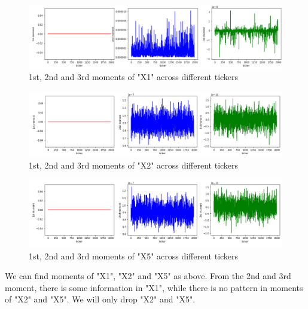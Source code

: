 \documentclass[onecolumn]{article}
\begin{document}
\begin{figure}[H]
\centering
\includegraphics[scale=0.52]{moments_x1.PNG}
\caption{1st, 2nd and 3rd moments of "X1" across different tickers}
\label{fig:label}
\end{figure}

\begin{figure}[H]
\centering
\includegraphics[scale=0.7]{moments_x2.PNG}
\caption{1st, 2nd and 3rd moments of "X2" across different tickers}
\label{fig:label}
\end{figure}

\begin{figure}[H]
\centering
\includegraphics[scale=0.7]{moments_x5.PNG}
\caption{1st, 2nd and 3rd moments of "X5" across different tickers}
\label{fig:label}
\end{figure}

\indent We can find moments of "X1", "X2" and "X5" as above. From the 2nd and 3rd moment, there is some information in "X1", while there is no pattern in moments of "X2" and "X5". We will only drop "X2" and "X5".
\end{document}
